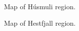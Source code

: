 \documentclass[extra]{gji}
\begin{document}
\begin{figure}
	\caption{
		Map of Húsmuli region.
		}
\end{figure}

\begin{figure}
	\caption{
		Map of Hestfjall region.
		}
\end{figure}
\end{document}
